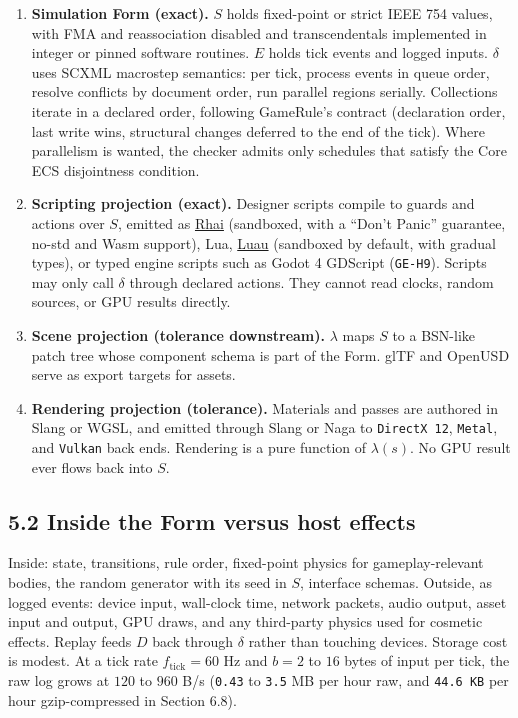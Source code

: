 \documentclass[10pt,letterpaper]{article}
\providecommand{\tightlist}{\setlength{\itemsep}{1pt}\setlength{\parskip}{0pt}}
\begin{document}
\begin{enumerate}
\def\labelenumi{\arabic{enumi}.}
\tightlist
\item
  \textbf{Simulation Form (exact).} \(S\) holds fixed-point or strict
  IEEE 754 values, with FMA and reassociation disabled and
  transcendentals implemented in integer or pinned software routines.
  \(E\) holds tick events and logged inputs. \(\delta\) uses SCXML
  macrostep semantics: per tick, process events in queue order, resolve
  conflicts by document order, run parallel regions serially.
  Collections iterate in a declared order, following GameRule's contract
  (declaration order, last write wins, structural changes deferred to
  the end of the tick). Where parallelism is wanted, the checker admits
  only schedules that satisfy the Core ECS disjointness condition.
\item
  \textbf{Scripting projection (exact).} Designer scripts compile to
  guards and actions over \(S\), emitted as
  \href{https://rhai.rs/book/about/features.html}{Rhai} (sandboxed, with
  a ``Don't Panic'' guarantee, no-std and Wasm support), Lua,
  \href{https://luau.org/}{Luau} (sandboxed by default, with gradual
  types), or typed engine scripts such as Godot 4 GDScript
  (\texttt{GE-H9}). Scripts may only call \(\delta\) through declared
  actions. They cannot read clocks, random sources, or GPU results
  directly.
\item
  \textbf{Scene projection (tolerance downstream).} \(\lambda\) maps
  \(S\) to a BSN-like patch tree whose component schema is part of the
  Form. glTF and OpenUSD serve as export targets for assets.
\item
  \textbf{Rendering projection (tolerance).} Materials and passes are
  authored in Slang or WGSL, and emitted through Slang or Naga to
  \texttt{DirectX\ 12}, \texttt{Metal}, and \texttt{Vulkan} back ends.
  Rendering is a pure function of \(\lambda(s)\). No GPU result ever
  flows back into \(S\).
\end{enumerate}

\subsection{5.2 Inside the Form versus host
effects}\label{inside-the-form-versus-host-effects}

Inside: state, transitions, rule order, fixed-point physics for
gameplay-relevant bodies, the random generator with its seed in \(S\),
interface schemas. Outside, as logged events: device input, wall-clock
time, network packets, audio output, asset input and output, GPU draws,
and any third-party physics used for cosmetic effects. Replay feeds
\(D\) back through \(\delta\) rather than touching devices. Storage cost
is modest. At a tick rate \(f_{\text{tick}} = 60\) Hz and \(b = 2\) to
\(16\) bytes of input per tick, the raw log grows at \(120\) to \(960\)
B/s (\texttt{0.43} to \texttt{3.5} MB per hour raw, and
\texttt{44.6\ KB} per hour gzip-compressed in Section 6.8).
\end{document}

